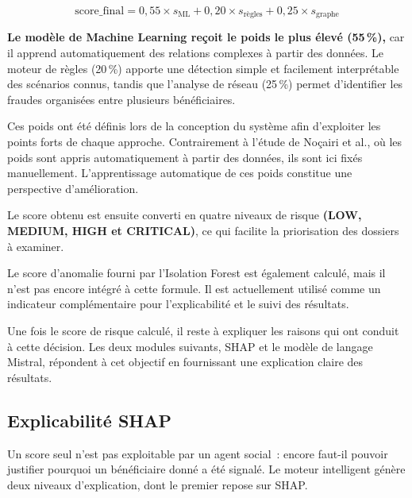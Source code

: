 \documentclass[a4paper, oneside, 12pt]{book}
\begin{document}
\begin{equation}
\text{score\_final}=0{,}55 \times s_{\text{ML}}
+0{,}20 \times s_{\text{règles}}
+0{,}25 \times s_{\text{graphe}}
\label{eq:score-hybride}
\end{equation}

\hspace{0.5cm}\textbf{Le modèle de Machine Learning reçoit le poids le plus élevé (55\,\%),} car il apprend automatiquement des relations complexes à partir des données. Le moteur de règles (20\,\%) apporte une détection simple et facilement interprétable des scénarios connus, tandis que l'analyse de réseau (25\,\%) permet d'identifier les fraudes organisées entre plusieurs bénéficiaires.

\hspace{0.5cm}Ces poids ont été définis lors de la conception du système afin d'exploiter les points forts de chaque approche. Contrairement à l'étude de Noçairi et al., où les poids sont appris automatiquement à partir des données, ils sont ici fixés manuellement. L'apprentissage automatique de ces poids constitue une perspective d'amélioration.

\hspace{0.5cm}Le score obtenu est ensuite converti en quatre niveaux de risque \textbf{(LOW, MEDIUM, HIGH et CRITICAL)}, ce qui facilite la priorisation des dossiers à examiner.

\hspace{0.5cm}Le score d'anomalie fourni par l'Isolation Forest est également calculé, mais il n'est pas encore intégré à cette formule. Il est actuellement utilisé comme un indicateur complémentaire pour l'explicabilité et le suivi des résultats.

\hspace{0.5cm}Une fois le score de risque calculé, il reste à expliquer les raisons qui ont conduit à cette décision. Les deux modules suivants, SHAP et le modèle de langage Mistral, répondent à cet objectif en fournissant une explication claire des résultats.

\subsection{Explicabilité SHAP}

\hspace{0.5cm}Un score seul n'est pas exploitable par un agent social~: encore faut-il pouvoir justifier pourquoi un bénéficiaire donné a été signalé. Le moteur intelligent génère deux niveaux d'explication, dont le premier repose sur SHAP.
\end{document}
